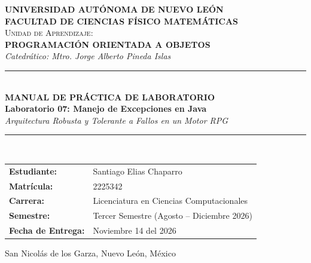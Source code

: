 \documentclass[11pt,letterpaper]{article}
\begin{document}
\begin{titlepage}
    \centering
    \vspace*{0.5cm}
    
    {\Huge \textbf{UNIVERSIDAD AUTÓNOMA DE NUEVO LEÓN}}\\[0.4cm]
    {\LARGE \textbf{FACULTAD DE CIENCIAS FÍSICO MATEMÁTICAS}}\\[2.5cm]
    
    {\large \textsc{Unidad de Aprendizaje:}}\\[0.2cm]
    {\Large \textbf{PROGRAMACIÓN ORIENTADA A OBJETOS}}\\[0.3cm]
    {\large \textit{Catedrático: Mtro. Jorge Alberto Pineda Islas}}\\[2.0cm]
    
    \rule{\linewidth}{0.6mm}\\[0.4cm]
    {\huge \textbf{MANUAL DE PRÁCTICA DE LABORATORIO}}\\[0.3cm]
    {\Large \textbf{Laboratorio 07: Manejo de Excepciones en Java}}\\[0.2cm]
    {\large \textit{Arquitectura Robusta y Tolerante a Fallos en un Motor RPG}}\\[0.3cm]
    \rule{\linewidth}{0.6mm}\\[2.2cm]
    
    \begin{minipage}{0.85\textwidth}
        \begin{tabular}{ll}
            \textbf{Estudiante:} & Santiago Elias Chaparro \\
            \textbf{Matrícula:} & 2225342 \\
            \textbf{Carrera:} & Licenciatura en Ciencias Computacionales \\
            \textbf{Semestre:} & Tercer Semestre (Agosto -- Diciembre 2026) \\
            \textbf{Fecha de Entrega:} & Noviembre 14 del 2026 \\
        \end{tabular}
    \end{minipage}
    
    \vfill
    {\small San Nicolás de los Garza, Nuevo León, México}
    \vspace*{0.5cm}
\end{titlepage}

\tableofcontents
\newpage
\end{document}
